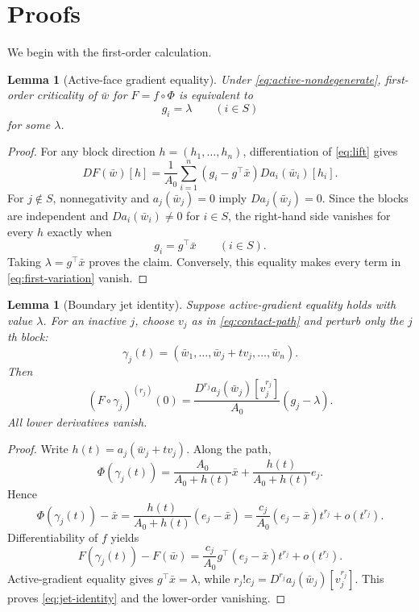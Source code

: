 \documentclass[11pt]{article}
\newtheorem{lemma}[theorem]{Lemma}
\theoremstyle{definition}
\theoremstyle{remark}
\begin{document}
\section{Proofs}\label{sec:proofs}

We begin with the first-order calculation.

\begin{lemma}[Active-face gradient equality]\label{lem:first-order}
Under \eqref{eq:active-nondegenerate}, first-order criticality of $\bar w$ for
$F=f\circ\Phi$ is equivalent to
\[
  g_i=\lambda\qquad(i\in S)
\]
for some $\lambda$.
\end{lemma}

\begin{proof}
For any block direction $h=(h_1,\ldots,h_n)$, differentiation of
\eqref{eq:lift} gives
\begin{equation}\label{eq:first-variation}
  DF(\bar w)[h]
  =\frac{1}{A_0}\sum_{i=1}^n
    (g_i-g^\top\bar x)Da_i(\bar w_i)[h_i].
\end{equation}
For $j\notin S$, nonnegativity and $a_j(\bar w_j)=0$ imply
$Da_j(\bar w_j)=0$. Since the blocks are independent and
$Da_i(\bar w_i)\ne0$ for $i\in S$, the right-hand side vanishes for every
$h$ exactly when
\[
  g_i=g^\top\bar x\qquad(i\in S).
\]
Taking $\lambda=g^\top\bar x$ proves the claim. Conversely, this equality
makes every term in \eqref{eq:first-variation} vanish.
\end{proof}

\begin{lemma}[Boundary jet identity]\label{lem:boundary-jet}
Suppose active-gradient equality holds with value $\lambda$. For an inactive
$j$, choose $v_j$ as in \eqref{eq:contact-path} and perturb only the $j$th
block:
\[
  \gamma_j(t)=(\bar w_1,\ldots,\bar w_j+t v_j,\ldots,\bar w_n).
\]
Then
\begin{equation}\label{eq:jet-identity}
  (F\circ\gamma_j)^{(r_j)}(0)
  =\frac{D^{r_j}a_j(\bar w_j)[v_j^{r_j}]}{A_0}
   (g_j-\lambda).
\end{equation}
All lower derivatives vanish.
\end{lemma}

\begin{proof}
Write $h(t)=a_j(\bar w_j+t v_j)$. Along the path,
\[
  \Phi(\gamma_j(t))
  =\frac{A_0}{A_0+h(t)}\bar x
   +\frac{h(t)}{A_0+h(t)}e_j.
\]
Hence
\[
  \Phi(\gamma_j(t))-\bar x
  =\frac{h(t)}{A_0+h(t)}(e_j-\bar x)
  =\frac{c_j}{A_0}(e_j-\bar x)t^{r_j}+o(t^{r_j}).
\]
Differentiability of $f$ yields
\[
  F(\gamma_j(t))-F(\bar w)
  =\frac{c_j}{A_0}g^\top(e_j-\bar x)t^{r_j}
   +o(t^{r_j}).
\]
Active-gradient equality gives $g^\top\bar x=\lambda$, while
$r_j!c_j=D^{r_j}a_j(\bar w_j)[v_j^{r_j}]$. This proves
\eqref{eq:jet-identity} and the lower-order vanishing.
\end{proof}
\end{document}
